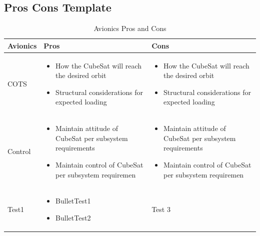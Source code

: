 \documentclass{ece}
\begin{document}
\subsection{Pros Cons Template}
\begin{table}[H]
\centering
\begin{tabular}{|p{}|p{}|p{}|} 
\hline
\textbf{Avionics} & \textbf{Pros} & \textbf{Cons}
\\
\hline
     COTS
     &
    \begin{itemize}
        \item How the CubeSat will reach the desired orbit
        \item Structural considerations for expected loading
    \end{itemize}
    &
    \begin{itemize}
        \item How the CubeSat will reach the desired orbit
        \item Structural considerations for expected loading
    \end{itemize}
    \\
\hline
     Control
     &
    \begin{itemize}
        \item Maintain attitude of CubeSat per subsystem requirements
        \item Maintain control of CubeSat per subsystem requiremen
    \end{itemize}
    &
        \begin{itemize}
        \item Maintain attitude of CubeSat per subsystem requirements
        \item Maintain control of CubeSat per subsystem requiremen
    \end{itemize}
    \\
\hline
    Test1
    &
    \begin{itemize}
        \item BulletTest1
        \item BulletTest2
    \end{itemize}
    &
    Test 3
    \\
\hline
\end{tabular}
\caption{Avionics Pros and Cons \cite{Boain}}
\label{tbl:avionicsprocon}
\end{table}
\end{document}
